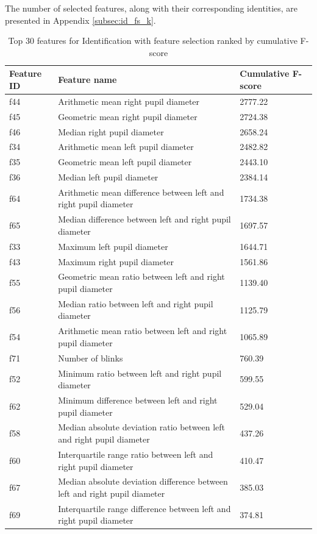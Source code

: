 \documentclass{article}
\begin{document}
The number of selected features, along with their corresponding identities, are presented in Appendix \ref{subsec:id_fs_k}.
\begin{table}[htbp]
\centering
\scriptsize
\setlength{\tabcolsep}{3pt}
\caption{Top 30 features for Identification with feature selection ranked by cumulative F-score}
\label{tab:top30_id}
\begin{tabular}{lll}
\toprule
\textbf{Feature ID} & \textbf{Feature name} & \textbf{Cumulative F-score} \\
\midrule
f44 & Arithmetic mean right pupil diameter & 2777.22 \\
f45 & Geometric mean right pupil diameter & 2724.38 \\
f46 & Median right pupil diameter & 2658.24 \\
f34 & Arithmetic mean left pupil diameter & 2482.82 \\
f35 & Geometric mean left pupil diameter & 2443.10 \\
f36 & Median left pupil diameter & 2384.14 \\
f64 & Arithmetic mean difference between left and right pupil diameter & 1734.38 \\
f65 & Median difference between left and right pupil diameter & 1697.57 \\
f33 & Maximum left pupil diameter & 1644.71 \\
f43 & Maximum right pupil diameter & 1561.86 \\
f55 & Geometric mean ratio between left and right pupil diameter & 1139.40 \\
f56 & Median ratio between left and right pupil diameter & 1125.79 \\
f54 & Arithmetic mean ratio between left and right pupil diameter & 1065.89 \\
f71 & Number of blinks & 760.39 \\
f52 & Minimum ratio between left and right pupil diameter & 599.55 \\
f62 & Minimum difference between left and right pupil diameter & 529.04 \\
f58 & Median absolute deviation ratio between left and right pupil diameter & 437.26 \\
f60 & Interquartile range ratio between left and right pupil diameter & 410.47 \\
f67 & Median absolute deviation difference between left and right pupil diameter & 385.03 \\
f69 & Interquartile range difference between left and right pupil diameter & 374.81 \\

\end{tabular}
\end{table}
\end{document}
